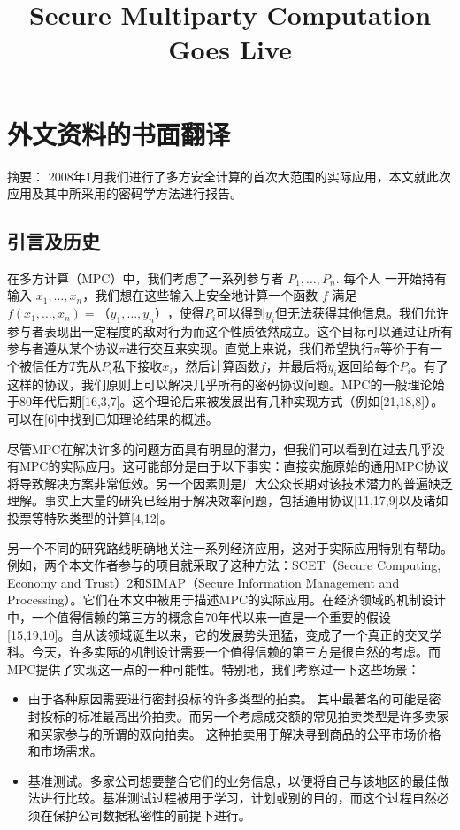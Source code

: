 \chapter{外文资料的书面翻译}

\title{Secure Multiparty Computation Goes Live}

{\heiti 摘要：} 2008年1月我们进行了多方安全计算的首次大范围的实际应用，本文就此次应用及其中所采用的密码学方法进行报告。

\section{引言及历史}
在多方计算（MPC）中，我们考虑了一系列参与者 $P_1,\dots,P_n$. 每个人
一开始持有输入 $x_1,\dots,x_n$，我们想在这些输入上安全地计算一个函数 $f$ 满足$f(x_1,\dots,x_n)=（y_1,\dots,y_n）$，使得$P_i$可以得到$y_i$但无法获得其他信息。我们允许参与者表现出一定程度的敌对行为而这个性质依然成立。这个目标可以通过让所有参与者遵从某个协议$\pi$进行交互来实现。直觉上来说，我们希望执行$\pi$等价于有一个被信任方$T$先从$P_i$私下接收$x_i$，然后计算函数$f$，并最后将$y_i$返回给每个$P_i$。有了这样的协议，我们原则上可以解决几乎所有的密码协议问题。MPC的一般理论始于80年代后期[16,3,7]。这个理论后来被发展出有几种实现方式（例如[21,18,8]）。可以在[6]中找到已知理论结果的概述。

尽管MPC在解决许多的问题方面具有明显的潜力，但我们可以看到在过去几乎没有MPC的实际应用。这可能部分是由于以下事实：直接实施原始的通用MPC协议将导致解决方案非常低效。另一个因素则是广大公众长期对该技术潜力的普遍缺乏理解。事实上大量的研究已经用于解决效率问题，包括通用协议[11,17,9]以及诸如投票等特殊类型的计算[4,12]。

另一个不同的研究路线明确地关注一系列经济应用，这对于实际应用特别有帮助。例如，两个本文作者参与的项目就采取了这种方法：SCET（Secure Computing, Economy and Trust）2和SIMAP（Secure Information Management and Processing）。它们在本文中被用于描述MPC的实际应用。在经济领域的机制设计中，一个值得信赖的第三方的概念自70年代以来一直是一个重要的假设[15,19,10]。自从该领域诞生以来，它的发展势头迅猛，变成了一个真正的交叉学科。今天，许多实际的机制设计需要一个值得信赖的第三方是很自然的考虑。而MPC提供了实现这一点的一种可能性。特别地，我们考察过一下这些场景：
\begin{itemize}
	\item 由于各种原因需要进行密封投标的许多类型的拍卖。 其中最著名的可能是密封投标的标准最高出价拍卖。而另一个考虑成交额的常见拍卖类型是许多卖家和买家参与的所谓的双向拍卖。 这种拍卖用于解决寻到商品的公平市场价格和市场需求。
	\item 基准测试。多家公司想要整合它们的业务信息，以便将自己与该地区的最佳做法进行比较。基准测试过程被用于学习，计划或别的目的，而这个过程自然必须在保护公司数据私密性的前提下进行。
\end{itemize}

